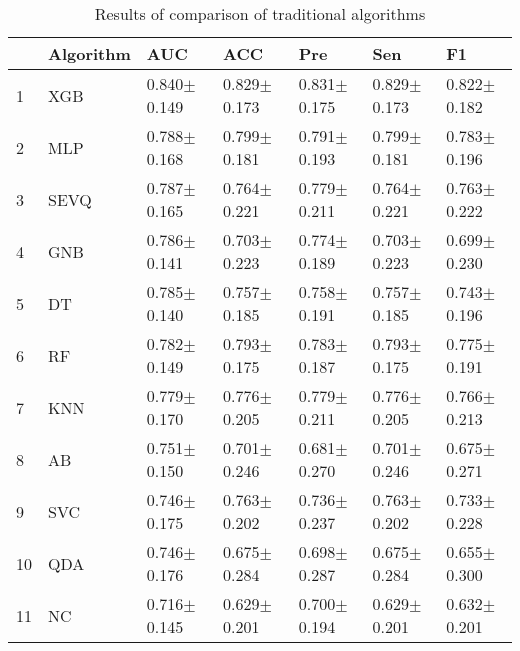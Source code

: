 \begin{table}[H]
\footnotesize
\centering
\caption{Results of comparison of traditional algorithms}
\label{tab:Traditional comparison}
\begin{tabular}{lllllll}
\hline
{} & Algorithm &              AUC &         ACC &        Pre &           Sen &               F1 \\
\hline
1  &       XGB &  0.840$\pm$0.149 &  0.829$\pm$0.173 &  0.831$\pm$0.175 &  0.829$\pm$0.173 &  0.822$\pm$0.182 \\
2  &       MLP &  0.788$\pm$0.168 &  0.799$\pm$0.181 &  0.791$\pm$0.193 &  0.799$\pm$0.181 &  0.783$\pm$0.196 \\
3  &      SEVQ &  0.787$\pm$0.165 &  0.764$\pm$0.221 &  0.779$\pm$0.211 &  0.764$\pm$0.221 &  0.763$\pm$0.222 \\
4  &       GNB &  0.786$\pm$0.141 &  0.703$\pm$0.223 &  0.774$\pm$0.189 &  0.703$\pm$0.223 &  0.699$\pm$0.230 \\
5  &        DT &  0.785$\pm$0.140 &  0.757$\pm$0.185 &  0.758$\pm$0.191 &  0.757$\pm$0.185 &  0.743$\pm$0.196 \\
6  &        RF &  0.782$\pm$0.149 &  0.793$\pm$0.175 &  0.783$\pm$0.187 &  0.793$\pm$0.175 &  0.775$\pm$0.191 \\
7  &       KNN &  0.779$\pm$0.170 &  0.776$\pm$0.205 &  0.779$\pm$0.211 &  0.776$\pm$0.205 &  0.766$\pm$0.213 \\
8  &        AB &  0.751$\pm$0.150 &  0.701$\pm$0.246 &  0.681$\pm$0.270 &  0.701$\pm$0.246 &  0.675$\pm$0.271 \\
9  &       SVC &  0.746$\pm$0.175 &  0.763$\pm$0.202 &  0.736$\pm$0.237 &  0.763$\pm$0.202 &  0.733$\pm$0.228 \\
10 &       QDA &  0.746$\pm$0.176 &  0.675$\pm$0.284 &  0.698$\pm$0.287 &  0.675$\pm$0.284 &  0.655$\pm$0.300 \\
11 &        NC &  0.716$\pm$0.145 &  0.629$\pm$0.201 &  0.700$\pm$0.194 &  0.629$\pm$0.201 &  0.632$\pm$0.201 \\
\hline
\end{tabular}
\end{table}
